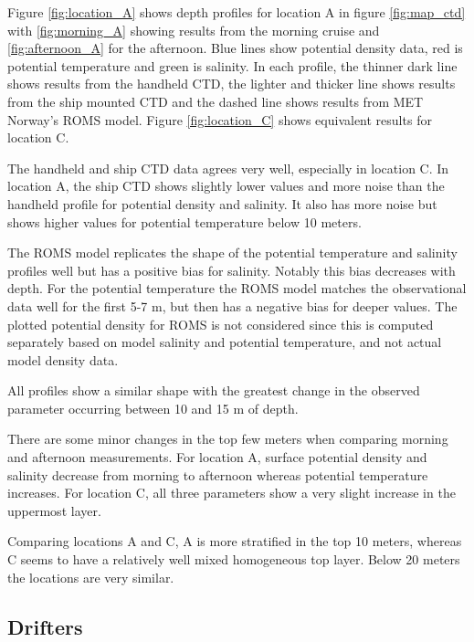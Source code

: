 \documentclass[a4paper,10pt,english]{article}
\begin{document}
\newpage
Figure \ref*{fig:location_A} shows depth profiles for location A in figure \ref*{fig:map_ctd} with \ref*{fig:morning_A} showing results from the morning cruise and \ref*{fig:afternoon_A} for the afternoon. Blue lines show potential density data, red is potential temperature and green is salinity. In each profile, the thinner dark line shows results from the handheld CTD, the lighter and thicker line shows results from the ship mounted CTD and the dashed line shows results from MET Norway's ROMS model. Figure \ref*{fig:location_C} shows equivalent results for location C.

The handheld and ship CTD data agrees very well, especially in location C. In location A, the ship CTD shows slightly lower values and more noise than the handheld profile for potential density and salinity. It also has more noise but shows higher values for potential temperature below 10 meters. 

The ROMS model replicates the shape of the potential temperature and salinity profiles well but has a positive bias for salinity. Notably this bias decreases with depth. For the potential temperature the ROMS model matches the observational data well for the first 5-7 m, but then has a negative bias for deeper values. The plotted potential density for ROMS is not considered since this is computed separately based on model salinity and potential temperature, and not actual model density data.

All profiles show a similar shape with the greatest change in the observed parameter occurring between 10 and 15 m of depth.

There are some minor changes in the top few meters when comparing morning and afternoon measurements. For location A, surface potential density and salinity decrease from morning to afternoon whereas potential temperature increases. For location C, all three parameters show a very slight increase in the uppermost layer.

Comparing locations A and C, A is more stratified in the top 10 meters, whereas C seems to have a relatively well mixed homogeneous top layer. Below 20 meters the locations are very similar.

\subsection{Drifters}
\end{document}
